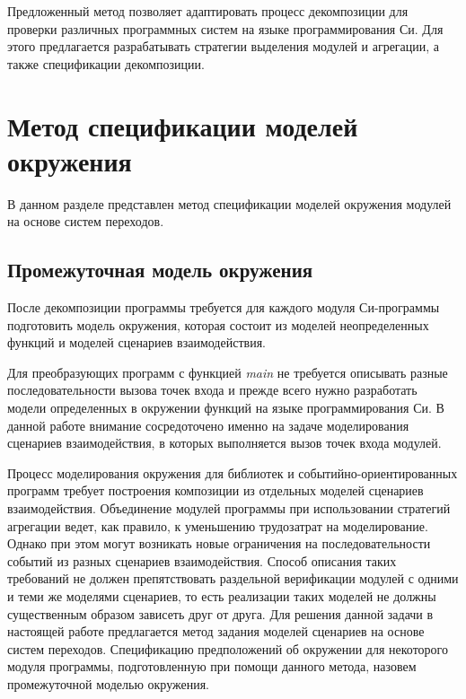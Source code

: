 Предложенный метод позволяет адаптировать процесс декомпозиции для проверки различных программных систем на языке программирования Си.
Для этого предлагается разрабатывать стратегии выделения модулей и агрегации, а также спецификации декомпозиции.

\section{Метод спецификации моделей окружения}
В данном разделе представлен метод спецификации моделей окружения модулей на основе систем переходов.

\subsection{Промежуточная модель окружения}
После декомпозиции программы требуется для каждого модуля Си-программы подготовить модель окружения, которая состоит из моделей неопределенных функций и моделей сценариев взаимодействия.

Для преобразующих программ с функцией \textit{main} не требуется описывать разные последовательности вызова точек входа и прежде всего нужно разработать модели определенных в окружении функций на языке программирования Си.
В данной работе внимание сосредоточено именно на задаче моделирования сценариев взаимодействия, в которых выполняется вызов точек входа модулей.

Процесс моделирования окружения для библиотек и событийно-ориентированных программ требует построения композиции из отдельных моделей сценариев взаимодействия.
Объединение модулей программы при использовании стратегий агрегации ведет, как правило, к уменьшению трудозатрат на моделирование.
Однако при этом могут возникать новые ограничения на последовательности событий из разных сценариев взаимодействия.
Способ описания таких требований не должен препятствовать раздельной верификации модулей с одними и теми же моделями сценариев, то есть реализации таких моделей не должны существенным образом зависеть друг от друга.
Для решения данной задачи в настоящей работе предлагается метод задания моделей сценариев на основе систем переходов.
Спецификацию предположений об окружении для некоторого модуля программы, подготовленную при помощи данного метода, назовем промежуточной моделью окружения.

